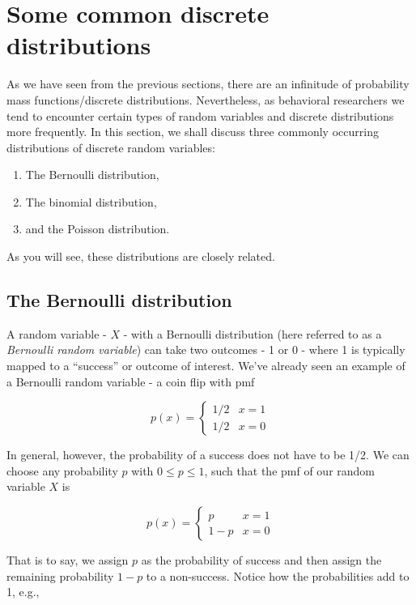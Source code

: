 \documentclass[
]{book}
\theoremstyle{definition}
\theoremstyle{definition}
\theoremstyle{definition}
\theoremstyle{definition}
\theoremstyle{remark}
\begin{document}
\section{Some common discrete distributions}\label{some-common-discrete-distributions}

As we have seen from the previous sections, there are an infinitude of probability mass functions/discrete distributions. Nevertheless, as behavioral researchers we tend to encounter certain types of random variables and discrete distributions more frequently. In this section, we shall discuss three commonly occurring distributions of discrete random variables:

\begin{enumerate}
\def\labelenumi{\arabic{enumi}.}
\item
  The Bernoulli distribution,
\item
  The binomial distribution,
\item
  and the Poisson distribution.
\end{enumerate}

As you will see, these distributions are closely related.

\subsection{The Bernoulli distribution}\label{the-bernoulli-distribution}

A random variable - \(X\) - with a Bernoulli distribution (here referred to as a \emph{Bernoulli random variable}) can take two outcomes - 1 or 0 - where 1 is typically mapped to a ``success'' or outcome of interest. We've already seen an example of a Bernoulli random variable - a coin flip with pmf

\[
p(x) = 
\begin{cases}
1/2 & x = 1 \\
1/2 & x = 0 
\end{cases}
\]

In general, however, the probability of a success does not have to be 1/2. We can choose any probability \(p\) with \(0 \leq p \leq 1\), such that the pmf of our random variable \(X\) is

\[
p(x) = 
\begin{cases}
p & x = 1 \\
1-p & x = 0 
\end{cases}
\label{eq:bernoulli}
\]

That is to say, we assign \(p\) as the probability of success and then assign the remaining probability \(1-p\) to a non-success. Notice how the probabilities add to 1, e.g.,
\end{document}
